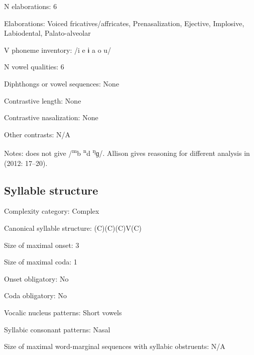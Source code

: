 {\begin{appendixdesc}
\item[N elaborations:] 6

\item[Elaborations:] Voiced fricatives/affricates, Prenasalization, Ejective, Implosive, Labiodental, Palato-alveolar

\item[V phoneme inventory:] /i e ɨ a o u/

\item[N vowel qualities:] 6

\item[Diphthongs or vowel sequences:] None

\item[Contrastive length:] None

\item[Contrastive nasalization:] None

\item[Other contrasts:] N/A

\item[Notes:] \citet{Mahamat2005} does not give /\textsuperscript{m}b \textsuperscript{n}d \textsuperscript{ŋ}ɡ/. Allison gives reasoning for different analysis in (2012: 17--20).
\end{appendixdesc}
\subsection*{Syllable structure}
\begin{appendixdesc}

\item[Complexity category:] Complex

\item[Canonical syllable structure:] (C)(C)(C)V(C) \citep[23--24]{Allison2012}

\item[Size of maximal onset:] 3

\item[Size of maximal coda:] 1

\item[Onset obligatory:] No

\item[Coda obligatory:] No

\item[Vocalic nucleus patterns:] Short vowels

\item[Syllabic consonant patterns:] Nasal

\item[Size of maximal word-marginal sequences with syllabic obstruents:] N/A


\end{appendixdesc}}
